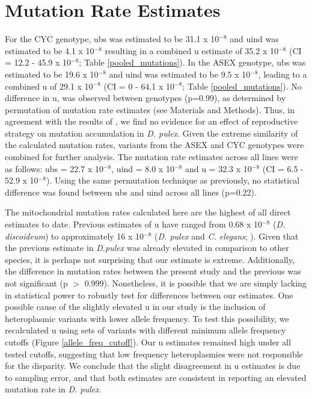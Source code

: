 \documentclass[12pt,twoside]{reedthesis}
\begin{document}
\section{Mutation Rate Estimates}
For the \gls{CYC} genotype, \gls{ubs} was estimated to be 31.1 x 10$^{-8}$ and \gls{uind} was estimated to be 4.1 x 10$^{-8}$ resulting in a combined \gls{u} estimate of 35.2 x 10$^{-8}$ (CI = 12.2 - 45.9 x 10$^{-8}$; Table \ref{pooled_mutations}).
In the \gls{ASEX} genotype, \gls{ubs} was estimated to be 19.6 x 10$^{-8}$ and \gls{uind} was estimated to be 9.5 x 10$^{-8}$, leading to a combined \gls{u} of 29.1 x 10$^{-8}$ (CI = 0 - 64.1 x 10$^{-8}$; Table \ref{pooled_mutations}).
No difference in \gls{u}, was observed between genotypes (p=0.99), as determined by permutation of mutation rate estimates (see Materials and Methods). 
Thus, in agreement with the results of \cite{xu_high_2012}, we find no evidence for an effect of reproductive strategy on mutation accumulation in \textit{D. pulex}.
Given the extreme similarity of the calculated mutation rates, variants from the \gls{ASEX} and \gls{CYC} genotypes were combined for further analysis.
The mutation rate estimates across all lines were as follows: \gls{ubs} = 22.7 x 10$^{-8}$, \gls{uind} = 8.0 x 10$^{-8}$ and \gls{u} = 32.3 x 10$^{-8}$ (CI = 6.5 - 52.9 x 10$^{-8}$).
Using the same permutation technique as previously, no statistical difference was found between \gls{ubs} and \gls{uind} across all lines (p=0.22).

The mitochondrial mutation rates calculated here are the highest of all direct estimates to date.
Previous estimates of \gls{u} have ranged from 0.68 x 10$^{-8}$ (\textit{D. discoideum}) to approximately 16 x 10$^{-8}$ (\textit{D. pulex} and \textit{C. elegans}; \citealp{denver_high_2000, xu_high_2012, saxer_whole_2012}). 
Given that the previous estimate in \textit{D.pulex} was already elevated in comparison to other species, it is perhaps not surprising that our estimate is extreme. 
Additionally, the difference in mutation rates between the present study and the previous was not significant (p $>$ 0.999).
Nonetheless, it is possible that we are simply lacking in statistical power to robustly test for differences between our estimates.
One possible cause of the slightly elevated \gls{u} in our study is the inclusion of heteroplasmic variants with lower allele frequency.
To test this possibility, we recalculated \gls{u} using sets of variants with different minimum allele frequency cutoffs (Figure \ref{allele_freq_cutoff}).
Our \gls{u} estimates remained high under all tested cutoffs, suggesting that low frequency heteroplasmies were not responsible for the disparity.
We conclude that the slight disagreement in \gls{u} estimates is due to sampling error, and that both estimates are consistent in reporting an elevated mutation rate in \textit{D. pulex}.
\end{document}
